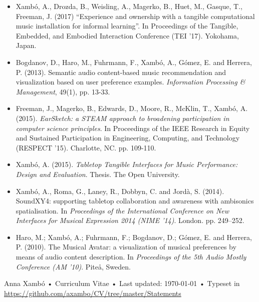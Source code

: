 \documentclass[10pt, a4paper]{article}
\begin{document}
\begin{itemize}
\item Xambó, A., Drozda, B., Weisling, A., Magerko, B., Huet, M., Gasque, T., Freeman, J. (2017) “Experience and ownership with a tangible computational music installation for informal learning”. In Proceedings of the Tangible, Embedded, and Embodied Interaction Conference (TEI ’17). Yokohama, Japan.
\item Bogdanov, D., Haro, M., Fuhrmann, F., Xambó, A., Gómez, E. and Herrera, P. (2013). Semantic audio content-based music recommendation and visualization based on user preference examples. \emph{Information Processing \& Management}, 49(1), pp. 13-33.
\item Freeman, J., Magerko, B., Edwards, D., Moore, R., McKlin, T., Xambó, A. (2015). \emph{EarSketch: a STEAM approach to broadening participation in computer science principles}. In Proceedings of the IEEE Research in Equity and Sustained Participation in Engineering, Computing, and Technology (RESPECT '15). Charlotte, NC. pp. 109-110.
\item Xambó, A. (2015). \emph{Tabletop Tangible Interfaces for Music Performance: Design and Evaluation}. Thesis. The Open University.
\item Xambó, A., Roma, G., Laney, R., Dobbyn, C. and Jordà, S. (2014). SoundXY4: supporting tabletop collaboration and awareness with ambisonics spatialisation. In \emph{Proceedings of the International Conference on New Interfaces for Musical Expression 2014 (NIME '14)}. London. pp. 249–252.
\item Haro, M.; Xambó, A.; Fuhrmann, F.; Bogdanov, D.; Gómez, E. and Herrera, P. (2010). The Musical Avatar: a visualization of musical preferences by means of audio content description. In \emph{Proceedings of the 5th Audio Mostly Conference (AM '10)}. Piteå, Sweden.
\end{itemize}



\vfill{}

\begin{center}
{\scriptsize  Anna Xambó •\- Curriculum Vitae •\- Last updated: \today\- •\- %
Typeset in \href{http://nitens.org/taraborelli/cvtex}{
\XeTeX }\\
\href{https://github.com/axambo/CV/tree/master/Statements}{https://github.com/axambo/CV/tree/master/Statements}}
\end{center}
\end{document}
